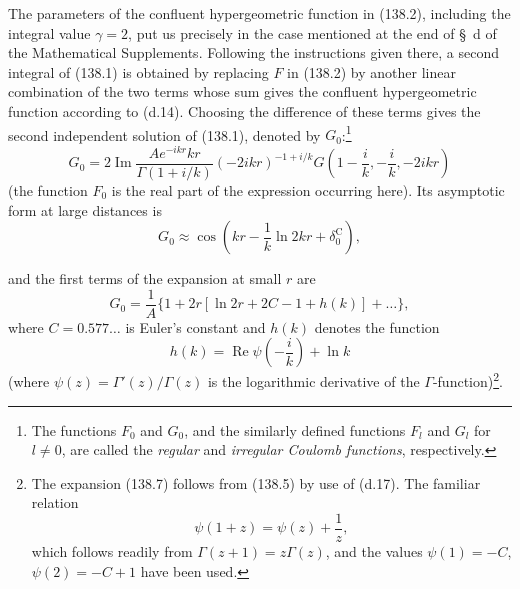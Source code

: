 The parameters of the confluent hypergeometric function in (138.2), including
the integral value $\gamma=2$, put us precisely in the case mentioned at the
end of \S~d of the Mathematical Supplements. Following the instructions
given there, a second integral of (138.1) is obtained by replacing $F$ in
(138.2) by another linear combination of the two terms whose sum gives the
confluent hypergeometric function according to (d.14). Choosing the difference
of these terms gives the second independent solution of (138.1), denoted by
$G_0$:\footnote{The functions $F_0$ and $G_0$, and the similarly defined
functions $F_l$ and $G_l$ for $l\ne0$, are called the \emph{regular} and
\emph{irregular Coulomb functions}, respectively.}
\begin{equation}
 G_0=2\operatorname{Im}\frac{Ae^{-ikr}kr}{\Gamma(1+i/k)}(-2ikr)^{-1+i/k}
 G\left(1-\frac{i}{k},-\frac{i}{k},-2ikr\right)
 \tag{138.5}
\end{equation}
(the function $F_0$ is the real part of the expression occurring here). Its
asymptotic form at large distances is
\begin{equation}
 G_0\approx\cos\left(kr-\frac1k\ln2kr+\delta_0^{\mathrm C}\right),
 \tag{138.6}
\end{equation}

and the first terms of the expansion at small $r$ are
\begin{equation}
 G_0=\frac1A\{1+2r[\ln2r+2C-1+h(k)]+\ldots\},
 \tag{138.7}
\end{equation}
where $C=0.577\ldots$ is Euler's constant and $h(k)$ denotes the function
\begin{equation}
 h(k)=\operatorname{Re}\psi\left(-\frac{i}{k}\right)+\ln k
 \tag{138.8}
\end{equation}
(where $\psi(z)=\Gamma'(z)/\Gamma(z)$ is the logarithmic derivative of the
$\Gamma$-function)\footnote{The expansion (138.7) follows from (138.5) by use
of (d.17). The familiar relation
\[
 \psi(1+z)=\psi(z)+\frac1z,
\]
which follows readily from $\Gamma(z+1)=z\Gamma(z)$, and the values
$\psi(1)=-C$, $\psi(2)=-C+1$ have been used.}.

